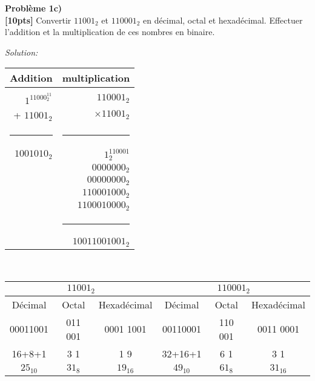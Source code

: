 \documentclass{article}
\newenvironment{problem}[2][Problème]
    { \begin{mdframed}[backgroundcolor=gray!20] \textbf{#1 #2} \\}
    {  \end{mdframed}}
\newenvironment{solution}
    {\textit{Solution:}}
    {}
\begin{document}
\begin{problem}{1c)}
\textbf{[10pts]} Convertir $11001_2$ et $110001_2$ en décimal, octal et hexadécimal. Effectuer l’addition et la multiplication de ces nombres en binaire.
\end{problem}
\begin{solution}
    \begin{tabular}{r|r}
        \large Addition & \large multiplication\\
        \hline\\
        \huge $1^11000^11_2$  & \huge $110001_2$\\
        + \huge $11001_2$       & \huge $\times 11001_2$\\
        \rule{1in}{2pt}         & \rule{1in}{2pt}\\
        \huge $1001010_2$       &  \Large $1^110001_2$\\
         & \Large $0000000_2$ \hspace{6pt}\\
         & \Large $00000000_2$ \hspace{8pt}\\
         & \Large $110001000_2$ \hspace{12pt}\\
         & \Large $1100010000_2$ \hspace{12pt}\\
         & \rule{1.2in}{2pt}\\
         & \Large $10011001001_2$
    \end{tabular}
    \\

    \begin{tabular}{|c|c|c|c|c|c|}
        \hline
        \multicolumn{3}{|c|}{\large $11001_2$} & \multicolumn{3}{|c|}{\large $110001_2$}\\
        \hline
        Décimal & Octal & Hexadécimal & Décimal & Octal & Hexadécimal\\
        \hline
        00011001 & 011 001 & 0001 1001 & 00110001 & 110 001 & 0011 0001\\
        16+8+1& 3\hspace{10pt} 1 & 1 \hspace{5pt}9 & 32+16+1 & 6\hspace{10pt} 1 & 3\hspace{5pt} 1\\
        $25_{10}$ & $31_8$ & $19_{16}$ & $49_{10}$ & $61_8$ & $31_{16}$\\
        \hline
    \end{tabular}
\end{solution}
\end{document}
